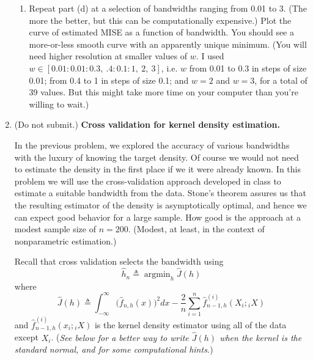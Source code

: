\documentclass[11pt]{report}
\DeclareMathOperator*{\argmin}{\arg\min}
\newcommand{\teq}{\triangleq}
\begin{document}
\begin{enumerate}[1.]
\begin{enumerate}
              \item
                    Repeat part (d) at a selection of bandwidths ranging from 0.01 to 3. (The more the better, but this can be computationally expensive.) Plot the curve of estimated MISE as a function of bandwidth. You should see a more-or-less smooth curve with an apparently unique minimum. (You will need higher resolution at smaller values of $w$. I used $w\in[0.01:0.01:0.3,\ .4:0.1:1,\  2,\  3]$, i.e. $w$ from 0.01 to 0.3 in steps of size 0.01; from 0.4 to 1 in steps of size 0.1; and $w = 2$
                    and $w=3$, for a total of 39 values. But this might take more time on your computer than you're willing to wait.)
          \end{enumerate}

          \pagebreak


    \item {\color{blue} (Do not submit.)} {\bf Cross validation for kernel density estimation.}
          \label{item:bandwidth}


          In the previous problem, we explored the accuracy of various bandwidths with the luxury of knowing the target density. Of course we would not need to estimate the density in the first place if we it were already known. In this problem we will use the cross-validation approach developed in class to estimate a suitable bandwidth from the data.  Stone's theorem assures us that the resulting estimator of the density is asymptotically optimal, and hence we can expect good behavior for a large sample. How good is the approach at a modest sample size of $n=200$. (Modest, at least, in the context of nonparametric estimation.)

          Recall that cross validation selects the bandwidth using
          \[ \widehat h_n \teq \argmin_h \widehat J(h) \]
          where \[ \widehat J(h) \teq \int_{-\infty}^\infty \bigl(\widehat f_{n,h}(x)\bigr)^2 dx - \frac{2}{n}\sum_{i=1}^n \widehat f^{(i)}_{n-1,h}(X_i;{_i}X)  \]
          and $\widehat f^{(i)}_{n-1,h}(x_i;{_i}X)$
          is the kernel density estimator using all of the data except $X_i$.
          ({\em See below for a better way to write $\widehat J(h)$ when the kernel is the standard normal, and for some computational hints.})


\end{enumerate}
\end{document}
